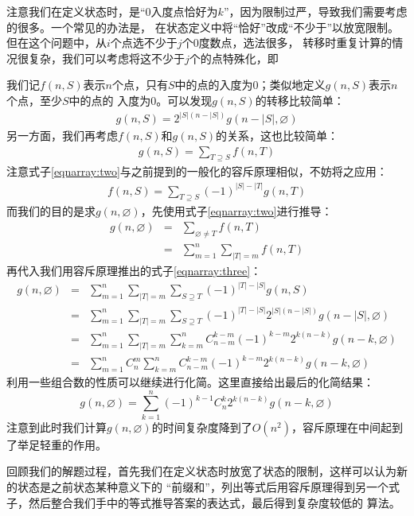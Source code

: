 \documentclass{noithesis}
\theoremstyle{plain}      \newtheorem{theorem}{定理}[subsection]
\theoremstyle{definition} \newtheorem{problem}{问题}[subsection]
\renewcommand{\emptyset}{\varnothing}
\begin{document}
注意我们在定义状态时，是“$0$入度点恰好为$k$”，因为限制过严，导致我们需要考虑的很多。一个常见的办法是，
在状态定义中将“恰好”改成“不少于”以放宽限制。但在这个问题中，从$i$个点选不少于$j$个$0$度数点，选法很多，
转移时重复计算的情况很复杂，我们可以考虑将这不少于$j$个的点特殊化，即 \par

我们记$f(n, S)$表示$n$个点，只有$S$中的点的入度为$0$；类似地定义$g(n, S)$表示$n$个点，至少$S$中的点的
入度为$0$。可以发现$g(n, S)$的转移比较简单：
\begin{eqnarray}
g(n, S) = 2^{|S|(n - |S|)}g(n - |S|, \emptyset) \label{eqnarray:one}
\end{eqnarray}
另一方面，我们再考虑$f(n,S)$和$g(n,S)$的关系，这也比较简单：
\begin{eqnarray}
g(n, S) = \sum_{T \supseteq S} f(n, T) \label{eqnarray:two}
\end{eqnarray}
注意式子\eqref{eqnarray:two}与之前提到的一般化的容斥原理相似，不妨将之应用：
\begin{eqnarray}
f(n, S) = \sum_{T \supseteq S} (-1)^{|S| - |T|} g(n, T) \label{eqnarray:three}
\end{eqnarray}
而我们的目的是求$g(n, \emptyset)$，先使用式子\eqref{eqnarray:two}进行推导：
\begin{eqnarray*}
g(n, \emptyset) & = & \sum_{\emptyset \neq T} f(n, T) \\
                & = & \sum_{m=1}^n \sum_{|T|=m} f(n, T)
\end{eqnarray*}
再代入我们用容斥原理推出的式子\eqref{eqnarray:three}：
\begin{eqnarray*}
g(n, \emptyset) & = & \sum_{m=1}^n \sum_{|T| = m} \sum_{S \supseteq T} (-1)^{|T| - |S|} g(n, S) \\
                & = & \sum_{m=1}^n \sum_{|T| = m} \sum_{S \supseteq T} (-1)^{|T| - |S|} 2^{|S|(n-|S|)} g(n-|S|, \emptyset) \\
				& = & \sum_{m=1}^n \sum_{|T| = m} \sum_{k=m}^n C_{n-m}^{k-m} (-1)^{k-m} 2^{k(n-k)} g(n - k, \emptyset) \\
				& = & \sum_{m=1}^n C_n^m \sum_{k=m}^n C_{n-m}^{k-m} (-1)^{k-m} 2^{k(n-k)} g(n - k, \emptyset)
\end{eqnarray*}
利用一些组合数的性质可以继续进行化简。这里直接给出最后的化简结果：
\[
g(n, \emptyset) = \sum_{k=1}^n (-1)^{k-1} C_n^k 2^{k(n-k)} g(n - k, \emptyset)
\]
注意到此时我们计算$g(n, \emptyset)$的时间复杂度降到了$O(n^2)$，容斥原理在中间起到了举足轻重的作用。 \par

回顾我们的解题过程，首先我们在定义状态时放宽了状态的限制，这样可以认为新的状态是之前状态某种意义下的
“前缀和”，列出等式后用容斥原理得到另一个式子，然后整合我们手中的等式推导答案的表达式，最后得到复杂度较低的
算法。 \par
\end{document}
